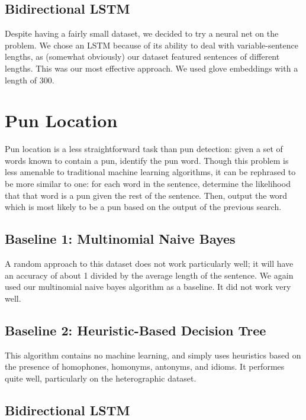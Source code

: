 \documentclass{article}
\begin{document}
\subsection{Bidirectional LSTM}

Despite having a fairly small dataset, we decided to try a neural net on the
problem. We chose an LSTM because of its ability to deal with variable-sentence
lengths, as (somewhat obviously) our dataset featured sentences of different
lengths. This was our most effective approach. We used glove embeddings with a
length of 300.

\section{Pun Location}\label{pun_location}

Pun location is a less straightforward task than pun detection: given a set of
words known to contain a pun, identify the pun word. Though this problem is less
amenable to traditional machine learning algorithms, it can be rephrased to be
more similar to one: for each word in the sentence, determine the likelihood
that that word is a pun given the rest of the sentence. Then, output the word
which is most likely to be a pun based on the output of the previous search.

\subsection{Baseline 1: Multinomial Naive Bayes}

A random approach to this dataset does not work particularly well; it will have
an accuracy of about 1 divided by the average length of the sentence. We again
used our multinomial naive bayes algorithm as a baseline. It did not work very
well.

\subsection{Baseline 2: Heuristic-Based Decision Tree}

This algorithm contains no machine learning, and simply uses heuristics based on
the presence of homophones, homonyms, antonyms, and idioms. It performes quite
well, particularly on the heterographic dataset.

\subsection{Bidirectional LSTM}
\end{document}

